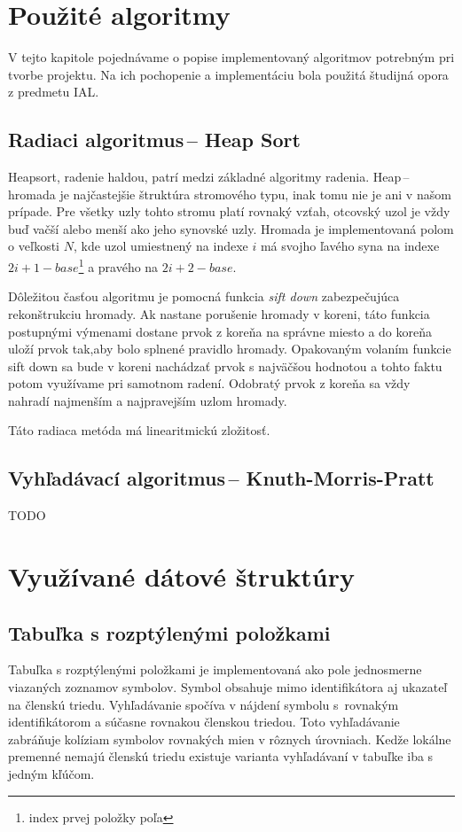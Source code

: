 \documentclass[11pt,a4paper]{article}
\begin{document}
    
    

\section{Použité algoritmy} 
\label{algoritmy}

 V tejto kapitole pojednávame o popise implementovaný algoritmov potrebným pri tvorbe projektu. Na ich pochopenie a implementáciu bola použitá študijná opora z predmetu IAL.

    \subsection{Radiaci algoritmus\,-- Heap Sort}
    
    Heapsort, radenie haldou, patrí medzi základné algoritmy radenia. Heap\,-- hromada je najčastejšie štruktúra stromového typu, inak tomu nie je ani v našom prípade. Pre všetky uzly tohto stromu platí rovnaký vzťah, otcovský uzol je vždy buď vačší alebo menší ako jeho synovské uzly. Hromada je implementovaná polom o veľkosti $N$, kde uzol umiestnený na indexe $i$ má svojho ľavého syna na indexe $2i+1-base$\footnote{index prvej položky poľa} a pravého na $2i+2-base$. 
    
    Dôležitou časťou algoritmu je pomocná funkcia \textit{sift down} zabezpečujúca rekonštrukciu hromady. Ak nastane porušenie hromady v koreni, táto funkcia postupnými výmenami dostane prvok z koreňa na správne miesto a do koreňa uloží prvok tak,aby bolo splnené pravidlo hromady. Opakovaným volaním funkcie sift down sa bude v koreni nachádzať prvok s najväčšou hodnotou a tohto faktu potom využívame pri samotnom radení. Odobratý prvok z koreňa sa vždy nahradí najmenším a najpravejším uzlom hromady.
    
    Táto radiaca metóda má linearitmickú zložitosť.
    
    \subsection{Vyhľadávací algoritmus\,-- Knuth-Morris-Pratt}
    
    TODO
    
\section{Využívané dátové štruktúry} 
\label{struktury}

        \subsection{Tabuľka s rozptýlenými položkami}
        Tabuľka s rozptýlenými položkami je implementovaná ako pole jednosmerne viazaných zoznamov symbolov. Symbol obsahuje
        mimo identifikátora aj ukazateľ na členskú triedu. Vyhľadávanie spočíva v nájdení symbolu s~rovnakým identifikátorom
        a súčasne rovnakou členskou triedou. Toto vyhľadávanie zabráňuje kolíziam symbolov rovnakých mien v rôznych úrovniach.
        Kedže lokálne premenné nemajú členskú triedu existuje varianta vyhľadávaní v tabuľke iba s jedným kľúčom.
\end{document}
